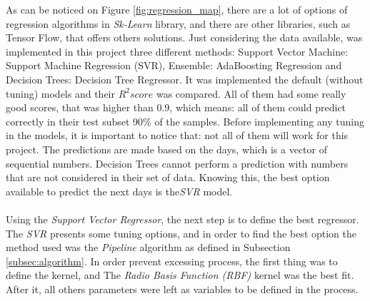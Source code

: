 As can be noticed on Figure \ref{fig:regression_map}, there are a lot of options of regression algorithms in \textit{Sk-Learn} library, and there are other libraries, such as Tensor Flow, that offers
others solutions. Just considering the data available, was implemented in this project three different methods: Support Vector Machine: Support Machine Regression (SVR), Ensemble: AdaBoosting Regression
and Decision Trees: Decision Tree Regressor. It was implemented the default (without tuning) models and their $R^2 score$ was compared. All of them had some really good scores, that was higher
than 0.9, which means: all of them could predict correctly in their test subset 90\% of the samples. Before implementing any tuning in the models, it is important to notice that: not all of them
will work for this project. The predictions are made based on the days, which is a vector of sequential numbers. Decision Trees cannot perform a prediction with numbers that are not considered
in their set of data. Knowing this, the best option available to predict the next days is the\textit{SVR} model.\\
\\
Using the \textit{Support Vector Regressor}, the next step is to define the best regressor. The \textit{SVR} presents some tuning options, and in order to find the best option the method used
was the \textit{Pipeline} algorithm as defined in Subsection \ref{subsec:algorithm}. In order prevent excessing process, the first thing was to define the kernel, and The \textit{Radio Basis Function (RBF)}
kernel was the best fit. After it, all others parameters were left as variables to be defined in the process.\\


